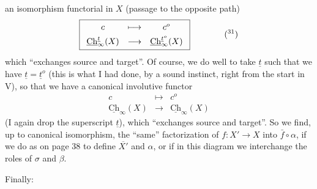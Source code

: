 \documentclass[11pt]{article}
\newcommand{\uCh}{\underline{\mathrm{Ch}}}
\begin{document}
an isomorphism functorial in $X$ (passage to the opposite path)
\[
\boxed{\begin{array}{ccc}
c & \longmapsto & c^o\\[4pt]
\uCh^{\underline{t}}_\infty(X) & \longrightarrow & \uCh^{\underline{t}^o}_\infty(X)
\end{array}}
\qquad\qquad
\text{(\footnotemark[31])}
\]
which ``exchanges source and target''. Of course, we do well to take $\underline{t}$ such that we have $\underline{t}=\underline{t}^o$ (this is what I had done, by a sound instinct, right from the start in V), so that we have a canonical involutive functor
\[
\begin{array}{ccc}
c & \longmapsto & c^o\\[4pt]
\uCh_\infty(X) & \longrightarrow & \uCh_\infty(X)
\end{array}
\]
(I again drop the superscript $\underline{t}$), which ``exchanges source and target''. So we find, up to canonical isomorphism, the ``same'' factorization of $f:X'\longrightarrow X$ into $\bar{f}\circ\alpha$, if we do as on page 38 to define $\overline{X'}$ and $\alpha$, or if in this diagram we interchange the roles of $\sigma$ and $\beta$. %

Finally:
\end{document}
